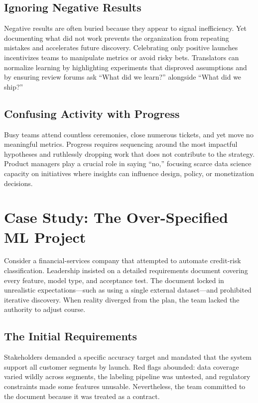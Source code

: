 \subsection{Ignoring Negative Results}
Negative results are often buried because they appear to signal inefficiency. Yet documenting what did not work prevents the organization from repeating mistakes and accelerates future discovery. Celebrating only positive launches incentivizes teams to manipulate metrics or avoid risky bets. Translators can normalize learning by highlighting experiments that disproved assumptions and by ensuring review forums ask ``What did we learn?'' alongside ``What did we ship?''

\subsection{Confusing Activity with Progress}
Busy teams attend countless ceremonies, close numerous tickets, and yet move no meaningful metrics. Progress requires sequencing around the most impactful hypotheses and ruthlessly dropping work that does not contribute to the strategy. Product managers play a crucial role in saying ``no,'' focusing scarce data science capacity on initiatives where insights can influence design, policy, or monetization decisions.

\section{Case Study: The Over-Specified ML Project}
\label{sec:case-overspecified}

Consider a financial-services company that attempted to automate credit-risk classification. Leadership insisted on a detailed requirements document covering every feature, model type, and acceptance test. The document locked in unrealistic expectations—such as using a single external dataset—and prohibited iterative discovery. When reality diverged from the plan, the team lacked the authority to adjust course.

\subsection{The Initial Requirements}
Stakeholders demanded a specific accuracy target and mandated that the system support all customer segments by launch. Red flags abounded: data coverage varied wildly across segments, the labeling pipeline was untested, and regulatory constraints made some features unusable. Nevertheless, the team committed to the document because it was treated as a contract.

